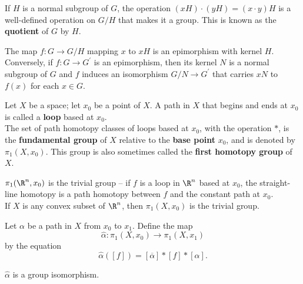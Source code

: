 \begin{definition}
If $H$ is a normal subgroup of $G$, the operation $(xH) \cdot (yH) = (x \cdot y)H$ is a well-defined operation on $G/H$ that makes it a group.
This is known as the \textbf{quotient} of $G$ by $H$.
\end{definition}

\begin{remark}
The map $f\colon G \rightarrow G/H$ mapping $x$ to $xH$ is an epimorphism with kernel $H$. \\

Conversely, if $f\colon G \rightarrow G^{\prime}$ is an epimorphism, then its kernel $N$ is a normal subgroup of $G$ and $f$ induces an isomorphism
$G/N \rightarrow G^{\prime}$ that carries $xN$ to $f(x)$ for each $x \in G$.
\end{remark}

\begin{definition}
Let $X$ be a space; let $x_0$ be a point of $X$. A path in $X$ that begins and ends at $x_0$ is called a \textbf{loop} based at $x_0$. \\

The set of path homotopy classes of loops based at $x_0$, with the operation $*$, is the \textbf{fundamental group} of $X$ relative to the \textbf{base point} $x_0$,
and is denoted by $\pi_1(X, x_0)$. This group is also sometimes called the \textbf{first homotopy group} of $X$.
\end{definition}

\begin{eg}
$\pi_1(\R^n, x_0)$ is the trivial group -- if $f$ is a loop in $\R^n$ based at $x_0$, the straight-line homotopy is a path homotopy between $f$
and the constant path at $x_0$. \\

If $X$ is any convex subset of $\R^n$, then $\pi_1(X, x_0)$ is the trivial group.
\end{eg}

\begin{definition}
Let $\alpha$ be a path in $X$ from $x_0$ to $x_1$. Define the map
\[
    \hat{\alpha} \colon \pi_1(X, x_0) \rightarrow \pi_1(X, x_1)
\]
by the equation
\[
    \hat{\alpha}([f]) = [\overline{\alpha}] * [f] * [\alpha].
\]
\end{definition}

\begin{theorem}
$\hat{\alpha}$ is a group isomorphism.
\end{theorem}

